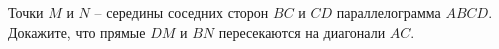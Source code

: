 \begin{ex}
	\begin{condition}
		Точки \( M  \) и \( N \) – середины соседних сторон \( BC  \) и \( CD \) параллелограмма \( ABCD \). Докажите, что прямые \( DM  \) и \( BN \) пересекаются на диагонали \( AC \).
	\end{condition}
\end{ex}
